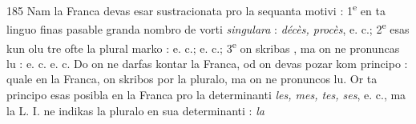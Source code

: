 \begin{VUpage}[189]{185}
Nam la Franca devas esar sustracionata pro la sequanta\nl
motivi : 1\textsuperscript{e}  en ta linguo finas pasable granda nombro de\nl
vorti \textit{singulara} : \nl
{}\nl
\textit{décès, procès}, e. c.; 2\textsuperscript{e}  esas kun olu tre ofte la plural\cc
marko : \nl
{} e. c.; \nl
{}\nl
{} e. c.; 3\textsuperscript{e} on skribas , ma on ne pronuncas lu : \nl
{}\nl
e. c. e. c. Do on ne darfas kontar la Franca, od on devas\nl
pozar kom principo : quale en la Franca, on skribos  por\nl
la pluralo, ma on ne pronuncos lu. Or ta principo esas\nl
posibla en la Franca pro la determinanti \textit{les, mes, tes, ses}, e. c.,\nl
ma la L. I. ne indikas la pluralo en sua determinanti : \textit{la}\nl
\end{VUpage}

